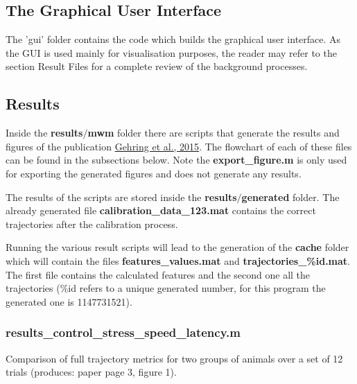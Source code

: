 \documentclass[12pt,titlepage]{article}
\begin{document}
\begin{doublespace}
\subsection{The Graphical User Interface}
The 'gui' folder contains the code which builds the graphical user interface. As the GUI is used mainly for visualisation purposes, the reader may refer to the section Result Files for a complete review of the background processes.

\subsection{Results}
Inside the \textbf{results$/$mwm} folder there are scripts that generate the results and figures of the publication \href{http://www.nature.com/articles/srep14562}{Gehring et al., 2015}. The flowchart of each of these files can be found in the subsections below. Note the \textbf{export\_figure.m} is only used for exporting the generated figures and does not generate any results. 

The results of the scripts are stored inside the \textbf{results$/$generated} folder. The already generated file \textbf{calibration\_data\_123.mat} contains the correct trajectories after the calibration process.

Running the various result scripts will lead to the generation of the \textbf{cache} folder which will contain the files \textbf{features\_values.mat} and \textbf{trajectories\_\%id.mat}. The first file contains the calculated features and the second one all the trajectories (\%id refers to a unique generated number, for this program the generated one is 1147731521). 

\subsubsection{results\_control\_stress\_speed\_latency.m}
Comparison of full trajectory metrics for two groups of animals over a set of 12 trials (produces: paper page 3, figure 1).


\end{doublespace}
\end{document}
